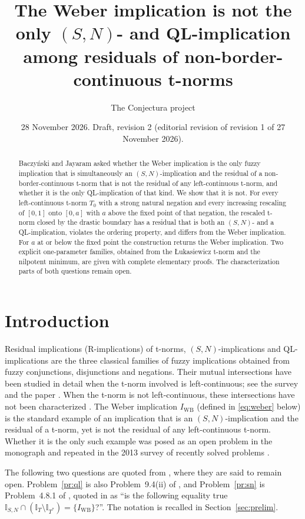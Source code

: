 \documentclass[11pt]{amsart}
\title[(S,N)- and QL-implications from non-border-continuous t-norms]
{The Weber implication is not the only $(S,N)$- and QL-implication among
residuals of non-border-continuous t-norms}
\author[Conjectura project]{The Conjectura project}
\date{28 November 2026. Draft, revision 2 (editorial revision of revision 1
of 27 November 2026).}
\numberwithin{equation}{section}
\theoremstyle{definition}
\theoremstyle{remark}
\newcommand{\IWB}{I_{\mathrm{WB}}}
\newcommand{\cI}{\mathbb{I}}
\begin{document}
\begin{abstract}
Baczy\'nski and Jayaram asked whether the Weber implication is the only fuzzy
implication that is simultaneously an $(S,N)$-implication and the residual of
a non-border-continuous t-norm that is not the residual of any left-continuous
t-norm, and whether it is the only QL-implication of that kind. We show that
it is not. For every left-continuous t-norm $T_0$ with a strong natural
negation and every increasing rescaling of $[0,1]$ onto $[0,a]$ with $a$ above
the fixed point of that negation, the rescaled t-norm closed by the drastic
boundary has a residual that is both an $(S,N)$- and a QL-implication,
violates the ordering property, and differs from the Weber implication. For
$a$ at or below the fixed point the construction returns the Weber
implication. Two explicit one-parameter families, obtained from the
{\L}ukasiewicz t-norm and the nilpotent minimum, are given with complete
elementary proofs. The characterization parts of both questions remain open.
\end{abstract}

\maketitle

\section{Introduction}\label{sec:intro}

Residual implications (R-implications) of t-norms, $(S,N)$-implications and
QL-implications are the three classical families of fuzzy implications
obtained from fuzzy conjunctions, disjunctions and negations. Their mutual
intersections have been studied in detail when the t-norm involved is
left-continuous; see the survey \cite{BJ2008} and the paper \cite{BJ2010}. When
the t-norm is not left-continuous, these intersections have not been
characterized \cite{BJ2013}. The Weber implication
$\IWB$ (defined in \eqref{eq:weber} below) is the standard example of an
implication that is an $(S,N)$-implication and the residual of a t-norm, yet is
not the residual of any left-continuous t-norm. Whether it is the only such
example was posed as an open problem in the monograph \cite{BJ2008book} and
repeated in the 2013 survey of recently solved problems \cite{BJ2013}.

The following two questions are quoted from \cite[Section~4, p.~202]{BJ2013},
where they are said to remain open. Problem~\ref{pr:ql} is also
Problem~9.4(ii) of \cite{BJ2010}, and Problem~\ref{pr:sn} is Problem~4.8.1 of
\cite{BJ2008book}, quoted in \cite[\S3.1.3]{BJ2013} as ``is the following
equality true $\cI_{S,N}\cap(\cI_T\setminus\cI_{T^*})=\{\IWB\}$?''. The
notation is recalled in Section~\ref{sec:prelim}.
\end{document}
